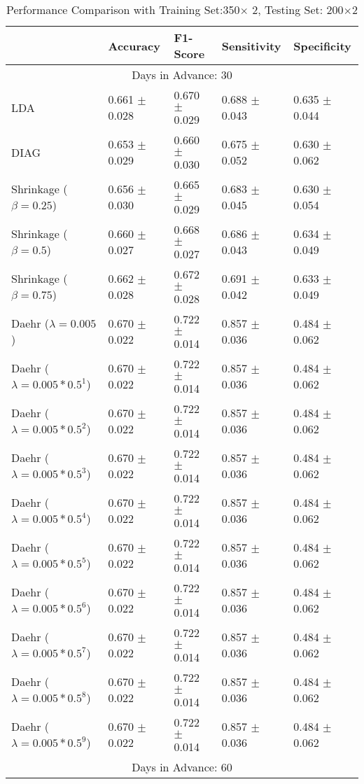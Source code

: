 \begin{table}
\caption{Performance Comparison with Training Set:350$\times$ 2, Testing Set: 200$\times$2}
\footnotesize
\centering
\begin{tabular}{*{5}{l}}
\toprule
 & Accuracy & F1-Score & Sensitivity & Specificity\\
\hline\multicolumn{5}{c}{  Days in Advance: 30}\\\hline
LDA&0.661 $\pm$ 0.028&0.670 $\pm$ 0.029&0.688 $\pm$ 0.043&0.635 $\pm$ 0.044\\
DIAG&0.653 $\pm$ 0.029&0.660 $\pm$ 0.030&0.675 $\pm$ 0.052&0.630 $\pm$ 0.062\\
Shrinkage ($\beta=0.25$)&0.656 $\pm$ 0.030&0.665 $\pm$ 0.029&0.683 $\pm$ 0.045&0.630 $\pm$ 0.054\\
Shrinkage ($\beta=0.5$)&0.660 $\pm$ 0.027&0.668 $\pm$ 0.027&0.686 $\pm$ 0.043&0.634 $\pm$ 0.049\\
Shrinkage ($\beta=0.75$)&0.662 $\pm$ 0.028&0.672 $\pm$ 0.028&0.691 $\pm$ 0.042&0.633 $\pm$ 0.049\\
Daehr ($\lambda=0.005$)&0.670 $\pm$ 0.022&0.722 $\pm$ 0.014&0.857 $\pm$ 0.036&0.484 $\pm$ 0.062\\
Daehr ($\lambda=0.005*0.5^1$)&0.670 $\pm$ 0.022&0.722 $\pm$ 0.014&0.857 $\pm$ 0.036&0.484 $\pm$ 0.062\\
Daehr ($\lambda=0.005*0.5^2$)&0.670 $\pm$ 0.022&0.722 $\pm$ 0.014&0.857 $\pm$ 0.036&0.484 $\pm$ 0.062\\
Daehr ($\lambda=0.005*0.5^3$)&0.670 $\pm$ 0.022&0.722 $\pm$ 0.014&0.857 $\pm$ 0.036&0.484 $\pm$ 0.062\\
Daehr ($\lambda=0.005*0.5^4$)&0.670 $\pm$ 0.022&0.722 $\pm$ 0.014&0.857 $\pm$ 0.036&0.484 $\pm$ 0.062\\
Daehr ($\lambda=0.005*0.5^5$)&0.670 $\pm$ 0.022&0.722 $\pm$ 0.014&0.857 $\pm$ 0.036&0.484 $\pm$ 0.062\\
Daehr ($\lambda=0.005*0.5^6$)&0.670 $\pm$ 0.022&0.722 $\pm$ 0.014&0.857 $\pm$ 0.036&0.484 $\pm$ 0.062\\
Daehr ($\lambda=0.005*0.5^7$)&0.670 $\pm$ 0.022&0.722 $\pm$ 0.014&0.857 $\pm$ 0.036&0.484 $\pm$ 0.062\\
Daehr ($\lambda=0.005*0.5^8$)&0.670 $\pm$ 0.022&0.722 $\pm$ 0.014&0.857 $\pm$ 0.036&0.484 $\pm$ 0.062\\
Daehr ($\lambda=0.005*0.5^9$)&0.670 $\pm$ 0.022&0.722 $\pm$ 0.014&0.857 $\pm$ 0.036&0.484 $\pm$ 0.062\\
\hline\multicolumn{5}{c}{  Days in Advance: 60}\\\hline

\end{tabular}
\end{table}
